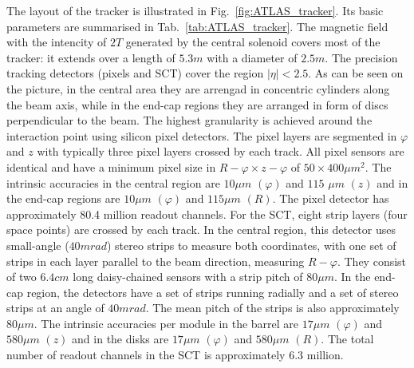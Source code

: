 The layout of the tracker is illustrated in Fig.~\ref{fig:ATLAS_tracker}. Its
basic parameters are summarised in Tab.~\ref{tab:ATLAS_tracker}. The magnetic field with the intencity of $2T$ generated by the central solenoid covers most of the tracker: it extends over a length of $5.3 m$ with a diameter of $2.5 m$. The precision tracking detectors (pixels and SCT) cover the region
$|\eta|<2.5$. As can be seen on the picture, in the central area they are arrengad in concentric cylinders along the beam axis, while in the end-cap regions they are arranged in form of discs perpendicular to the beam. The highest granularity is achieved around the interaction point using silicon pixel detectors. The pixel layers are
segmented in $\varphi$ and $z$ with typically three pixel layers crossed by each track. All pixel sensors
are identical and have a minimum pixel size in $R-\varphi \times z-\varphi$ of $50 \times 400 \mu m^2$. The intrinsic accuracies
in the central region are $10 \mu m$ $(\varphi)$ and $115$ $\mu m$ $(z)$ and in the end-cap regions are $10 \mu m$ $(\varphi)$ and $115 \mu m$ $(R)$.
The pixel detector has approximately 80.4 million readout channels. For the SCT, eight strip layers
(four space points) are crossed by each track. In the central region, this detector uses small-angle
($40 mrad$) stereo strips to measure both coordinates, with one set of strips in each layer parallel to
the beam direction, measuring $R-\varphi$. They consist of two $6.4 cm$ long daisy-chained sensors with
a strip pitch of $80 \mu m$. In the end-cap region, the detectors have a set of strips running radially and
a set of stereo strips at an angle of $40 mrad$. The mean pitch of the strips is also approximately
$80 \mu m$. The intrinsic accuracies per module in the barrel are $17 \mu m$ $(\varphi)$ and $580 \mu m$ $(z)$ and in
the disks are $17 \mu m$ $(\varphi)$ and $580 \mu m$ $(R)$. The total number of readout channels in the SCT is
approximately 6.3 million.


